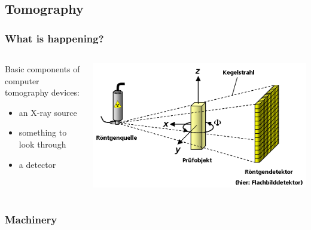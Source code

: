 \subsection{Tomography}
\begin{frame}
	\frametitle{What is happening?}
	\begin{columns}%
		\begin{column}{0.3822\linewidth}%
			Basic components of computer tomography devices:
			\begin{itemize}
				\item an X-ray source
				\item something to look through
				\item a detector
			\end{itemize}
		\end{column}%
		\begin{column}{0.6177\linewidth}%
			\centering%
			\includegraphics[width=\imagewidth]{./images/3D_Computed_Tomography}%
		\end{column}%
	\end{columns}%
\end{frame}

\begin{frame}
	\frametitle{Machinery}
	\begin{columns}
		\begin{column}{0.5\textwidth}
			\centering%
			\pause%
		\end{column}%
		\begin{column}{0.5\textwidth}%
			\centering%
			\only<3|handout:1>{}%
			\only<1-2|handout:1>{}%
			\only<4|handout:1>{}%
		\end{column}
	\end{columns}
\end{frame}

